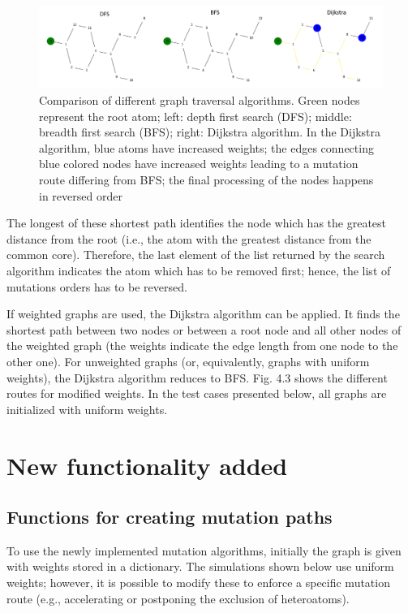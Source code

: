 \begin{figure}

\includegraphics[scale=0.45]{dfs_bfs_dijkstra_comp1}\caption{Comparison of different graph traversal algorithms. Green nodes represent the root atom; left: depth first
search (DFS); middle: breadth first search (BFS); right: Dijkstra algorithm. In the Dijkstra algorithm, blue atoms have increased weights;  the
edges connecting blue colored nodes have increased weights leading
to a mutation route differing from BFS; the final processing of the
nodes happens in reversed order}

\end{figure}

The longest of these shortest path identifies the node which has the greatest
distance from the root (i.e., the atom with the greatest distance from
the common core). Therefore, the last element of the list returned by the search algorithm indicates the atom which has to be removed first; hence, the list of mutations orders has to be reversed.

If weighted graphs are used, the Dijkstra algorithm can be applied.
It finds the shortest path between two nodes or between a root node
and all other nodes of the weighted graph (the weights indicate the
edge length from one node to the other one). For unweighted graphs
(or, equivalently, graphs with uniform weights), the Dijkstra algorithm
reduces to BFS. Fig. 4.3 shows the different routes for modified weights.
In the test cases presented below, all graphs are initialized with uniform weights.

\section{New functionality added}

\subsection{Functions for creating mutation paths}

To use the newly implemented mutation algorithms, initially the graph
is given with weights stored in a dictionary. The simulations shown
below use uniform weights; however, it is possible to modify these to
enforce a specific mutation route (e.g., accelerating or postponing
the exclusion of heteroatoms). 

